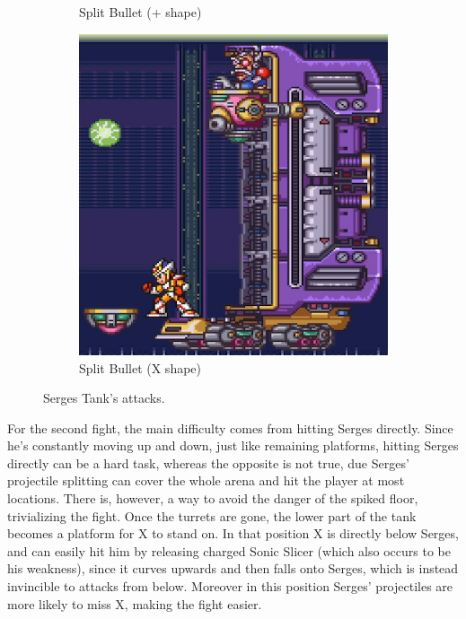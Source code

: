 \begin{figure}[htp]
\begin{subfigure}{.32\linewidth}
		\caption{Split Bullet (+ shape)}
	\end{subfigure}
	\begin{subfigure}{.32\linewidth}
		\centering
		\includegraphics[width=\linewidth]{figures/X2/Hunter_stages/Serges_tank_5.png}
		\caption{Split Bullet (X shape)}
	\end{subfigure}
	\caption{Serges Tank's attacks.}	
\end{figure}

For the second fight, the main difficulty comes from hitting Serges directly. Since he's constantly moving up and down, just like remaining platforms, hitting Serges directly can be a hard task, whereas the opposite is not true, due Serges' projectile splitting can cover the whole arena and hit the player at most locations. There is, however, a way to avoid the danger of the spiked floor, trivializing the fight. Once the turrets are gone, the lower part of the tank becomes a platform for X to stand on. In that position X is directly below Serges, and can easily hit him by releasing charged Sonic Slicer (which also occurs to be his weakness), since it curves upwards and then falls onto Serges, which is instead invincible to attacks from below. Moreover in this position Serges' projectiles are more likely to miss X, making the fight easier.

